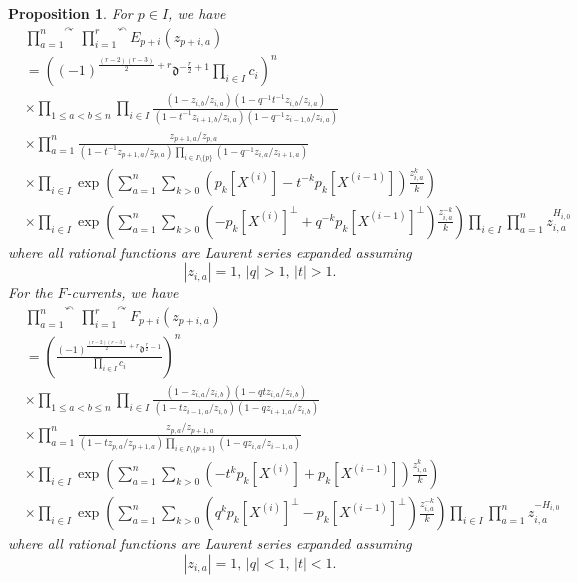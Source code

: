 \documentclass{amsart}
\newcommand{\ddd}{\mathfrak{d}}
\newtheorem{prop}[thm]{Proposition}
\theoremstyle{remark}
\numberwithin{thm}{section}
\numberwithin{equation}{section}
\begin{document}
\begin{prop}\label{NSNormalOrder}
For $p\in I$, we have
\begin{align*}
&\overset{\curvearrowright}{\prod_{a=1}^n}\,\overset{\curvearrowleft}{\prod_{i=1}^{r}}E_{p+i}(z_{p+i,a})\\
&=
\left( (-1)^{\frac{(r-2)(r-3)}{2}+r}\ddd^{-\frac{r}{2}+1}\prod_{i\in I} c_i\right)^n\\
&\times\prod_{1\le a<b\le n}\prod_{i\in I}
\frac{\displaystyle\left(1-z_{i,b}/z_{i,a}\right)\left(1-q^{-1}t^{-1}z_{i,b}/z_{i,a}\right)}{\displaystyle\left(1-t^{-1}z_{i+1,b}/z_{i,a}\right)\left(1-q^{-1}z_{i-1,b}/z_{i,a}\right)}\\
&\times\prod_{a=1}^n \frac{z_{p+1,a}/z_{p,a}}
{\left(1-t^{-1}z_{p+1,a}/z_{p,a}\right)
\prod_{i\in I\setminus\{p\}}
\left(1-q^{-1}z_{i,a}/z_{i+1,a}\right)}\\
&\times\prod_{i\in I}\exp\left(\sum_{a=1}^n\sum_{k>0}\left(p_{k}[X^{(i)}]-t^{-k}p_k[X^{(i-1)}]\right)\frac{z_{i,a}^{k}}{k}\right)\\
&\times\prod_{i\in I}\exp\left(\sum_{a=1}^n\sum_{k>0}\left(-p_{k}[X^{(i)}]^\perp+q^{-k}p_k[X^{(i-1)}]^\perp\right)\frac{z_{i,a}^{-k}}{k}\right)
\prod_{i\in I}\prod_{a=1}^n z_{i,a}^{H_{i,0}}
\end{align*}
where all rational functions are Laurent series expanded assuming 
\begin{equation}
|z_{i,a}|=1,\,
|q|>1,\,
|t|>1.
\end{equation}
For the $F$-currents, we have
\begin{align*}
&\overset{\curvearrowleft}{\prod_{a=1}^n}\,\overset{\curvearrowright}{\prod_{i=1}^{r}}F_{p+i}(z_{p+i,a})\\
&=\left( \frac{(-1)^{\frac{(r-2)(r-3)}{2}+r}\ddd^{\frac{r}{2}-1}}{\displaystyle\prod_{i\in I}c_i}\right)^n\\
&\times\prod_{1\le a<b\le n}\prod_{i\in I}
\frac{\left(1-z_{i,a}/z_{i,b}\right)\left(1-qtz_{i,a}/z_{i,b}\right)}{\left(1-tz_{i-1,a}/z_{i,b}\right)\left(1-qz_{i+1,a}/z_{i,b}\right)}\\
&\times \prod_{a=1}^n\frac{z_{p,a}/z_{p+1,a}}{\left(1-tz_{p,a}/z_{p+1,a}\right)
\prod_{i\in I\setminus\{p+1\}}
\left(1-qz_{i,a}/z_{i-1,a}\right)}\\
&\times\prod_{i\in I}\exp\left(\sum_{a=1}^n\sum_{k>0}\left(-t^{k}p_{k}[X^{(i)}]+p_k[X^{(i-1)}]\right)\frac{z_{i,a}^{k}}{k}\right)\\
&\times\prod_{i\in I}\exp\left(\sum_{a=1}^n\sum_{k>0}\left(q^{k}p_{k}[X^{(i)}]^\perp-p_k[X^{(i-1)}]^\perp\right)\frac{z_{i,a}^{-k}}{k}\right)
\prod_{i\in I}\prod_{a=1}^n z_{i,a}^{-H_{i,0}}
\end{align*}
where all rational functions are Laurent series expanded assuming 
\begin{equation}
|z_{i,a}|=1,\,
|q|< 1,\,
|t|<1.   
\end{equation}
\end{prop}
\end{document}
